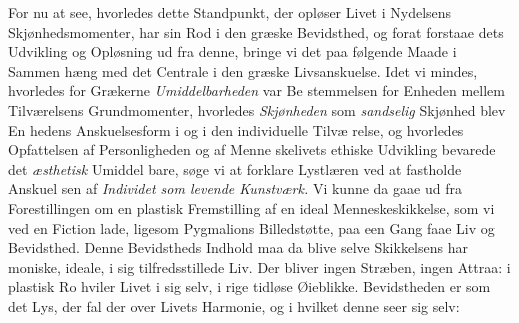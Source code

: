 For nu at see, hvorledes dette Standpunkt, der opløser
Livet i Nydelsens Skjønhedsmomenter, har sin Rod i den græske
Bevidsthed, og forat forstaae dets Udvikling og Opløsning ud
fra denne, bringe vi det paa følgende Maade i Sammen\-%
hæng med det Centrale i den græske Livsanskuelse. Idet vi
mindes, hvorledes for Grækerne \emph{Umiddelbarheden} var Be\-%
stemmelsen for Enheden mellem Tilværelsens Grundmomenter,
hvorledes \emph{Skjønheden} som \emph{sandselig} Skjønhed blev En\-%
hedens Anskuelsesform i  og i den individuelle Tilvæ\-%
%
relse, og hvorledes Opfattelsen af Personligheden og af Menne\-%
skelivets ethiske Udvikling bevarede det \emph{æsthetisk} Umiddel\-%
bare, søge vi at forklare Lystlæren ved at fastholde Anskuel\-%
sen af \emph{Individet som levende Kunstværk.} Vi kunne da
gaae ud fra Forestillingen om en plastisk Fremstilling af en
ideal Menneskeskikkelse, som vi ved en Fiction lade, ligesom
Pygmalions Billedstøtte, paa een Gang faae Liv og Bevidsthed.
Denne Bevidstheds Indhold maa da blive selve Skikkelsens har\-%
moniske, ideale, i sig tilfredsstillede Liv. Der bliver ingen
Stræben, ingen Attraa: i plastisk Ro hviler Livet i sig selv, i
rige tidløse Øieblikke. Bevidstheden er som det Lys, der fal\-%
der over Livets Harmonie, og i hvilket denne seer sig selv:
